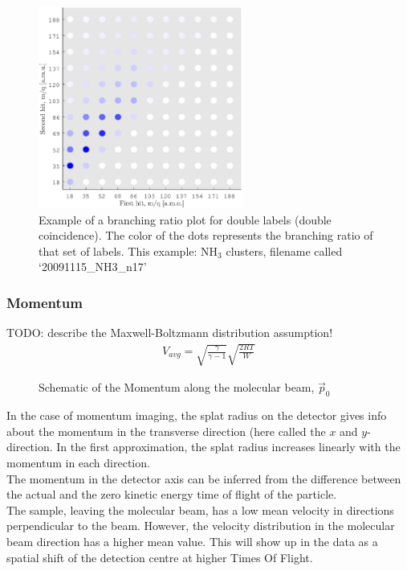 \begin{figure}[H]
   \centering
    \centerline{\includegraphics[width=0.6\textwidth]{Graphics/BR_2D.eps}}
\caption{Example of a branching ratio plot for double labels (double coincidence). The color of the dots represents the branching ratio of that set of labels. This example: NH$_3$ clusters, filename called `20091115\_NH3\_n17'}
\label{BR_1D}
\end{figure}

\subsubsection{Momentum}

TODO: describe the Maxwell-Boltzmann distribution assumption!
\begin{align}
V_{avg} = \sqrt{\frac{\gamma}{\gamma - 1}} \sqrt{\frac{2 R T}{W}}
\end{align}

\begin{figure}[H]
  \centering
  \vspace{0 cm}
  \def\svgwidth{200pt}
  \centerline{}
  \caption{Schematic of the Momentum along the molecular beam, $\vec{p}_{0}$}
\end{figure}


In the case of momentum imaging, the splat radius on the detector gives info about the momentum in the transverse direction (here called the $x$ and $y$-direction. In the first approximation, the splat radius increases linearly with the momentum in each direction.\\
The momentum in the detector axis can be inferred from the difference between the actual and the zero kinetic energy time of flight of the particle.\\
The sample, leaving the molecular beam, has a low mean velocity in directions perpendicular to the beam. However, the velocity distribution in the molecular beam direction has a higher mean value. 
This will show up in the data as a spatial shift of the detection centre at higher Times Of Flight. 

